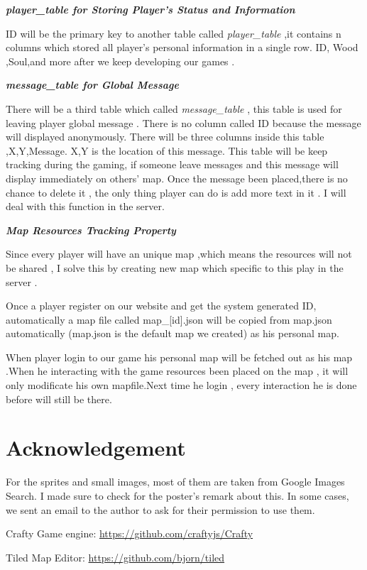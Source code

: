 \documentclass[a4wide, 11pt]{article}
\begin{document}
\textit{\textbf{player\_table for Storing Player’s Status and Information}}

ID will be the primary key to another table called \textit{player\_table} ,it contains n columns which stored all player’s personal information in a single row. ID, Wood ,Soul,and more after we keep developing our games .

\textit{\textbf{message\_table for Global Message }}

There will be a third table which called \textit{message\_table} , this table is used for leaving player global message . There is no column called ID because the message will displayed anonymously. There will be three columns inside this table ,X,Y,Message. X,Y is the location of this message. This table will be keep tracking during the gaming, if someone leave messages and this message will display immediately on others’ map. Once the message been placed,there is no chance to delete it , the only thing player can do is add more text in it . I will deal with this function in the server.

\textit{\textbf{Map Resources Tracking Property}}

Since every player will have an unique map ,which means the resources will not be shared , I solve this by creating new map which specific to this play in the server . 

Once a player register on our website and get the system generated ID, automatically a map file called map\_[id].json will be copied from map.json automatically (map.json is the default map we created) as his personal map. 

When player login to our game his personal map will be fetched out as his map .When he interacting with the game resources been placed on the map , it will only modificate his own mapfile.Next time he login , every interaction he is done before will still be there.

\section{Acknowledgement}

For the sprites and small images, most of them are taken from Google Images Search. I made sure to check for the poster’s remark about this. In some cases, we sent an email to the author to ask for their permission to use them.

Crafty Game engine: \url{https://github.com/craftyjs/Crafty}

Tiled Map Editor: \url{https://github.com/bjorn/tiled}
\end{document}
